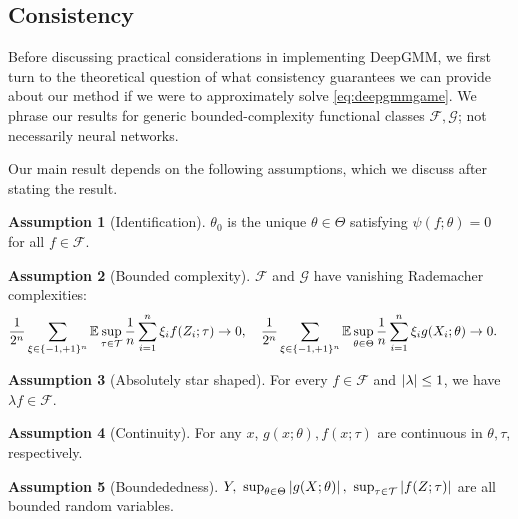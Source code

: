 \documentclass{article}
\theoremstyle{plain}
\theoremstyle{definition}
\newtheorem{assumption}{Assumption}
\newcommand\T{\mathcal T}
\begin{document}
%
%

%
%


%
%
%
%
%

%
%
%
%
%
%
%
%
%

%

\subsection{Consistency}

Before discussing practical considerations in implementing DeepGMM, we first turn to the theoretical question of what consistency guarantees we can provide about our method if we were to approximately solve \cref{eq:deepgmmgame}.
We phrase our results for generic bounded-complexity functional classes $\mathcal F,\mathcal G$; not necessarily neural networks.
%
%
%

Our main result depends on the following assumptions, which we discuss after stating the result.

\begin{assumption}[Identification]\label{asm:specification}
$\theta_0$ is the unique $\theta\in\Theta$ satisfying
$\psi(f;\theta)=0$ for all $f\in\mathcal F$.
\end{assumption}

\begin{assumption}[Bounded complexity]\label{asm:complexity}
$\mathcal F$ and $\mathcal G$ have vanishing Rademacher complexities:
\begin{align*}
&\frac{1}{2^n}\sum_{\xi\in\{-1,+1\}^n}\E\sup_{\tau\in\T}\frac1n\sum_{i=1}^n\xi_if(Z_i;\tau)\to0,\quad
\frac{1}{2^n}\sum_{\xi\in\{-1,+1\}^n}\E\sup_{\theta\in\Theta}\frac1n\sum_{i=1}^n\xi_ig(X_i;\theta)\to0.
\end{align*}
%
\end{assumption}

\begin{assumption}[Absolutely star shaped]\label{asm:closure}
For every $f \in \mathcal{F}$ and $\left|\lambda\right| \leq 1$, we have $\lambda f \in \mathcal{F}$.
\end{assumption}

\begin{assumption}[Continuity]\label{asm:continuity}
For any $x$,
$g(x;\theta),f(x;\tau)$ are continuous in $\theta,\tau$, respectively.
%
\end{assumption}

\begin{assumption}[Boundededness]\label{asm:bounded}
$Y,\ \sup_{\theta\in\Theta}\abs{g(X;\theta)},\ \sup_{\tau\in\T}\abs{f(Z;\tau)}$ are all bounded random variables.
\end{assumption}
\end{document}
